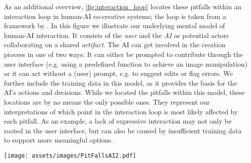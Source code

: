 \documentclass[
twocolumn,
]{ceurart}
\begin{document}
As an additional overview, \cref{fig:interaction_loop} locates these pitfalls within an interaction loop in human-AI co-creative systems; the loop is taken from a framework by \citet{Guzdial2019}. 
In this figure we illustrate our underlying mental model of human-AI interaction. It consists of the \textit{user} and the \textit{AI} as potential actors collaborating on a shared \textit{artifact}. The AI can get involved in the creation process in one of two ways: It can either be prompted to contribute through the user interface (e.g. using a predefined function to achieve an image manipulation) or it can act without a (user) prompt, e.g. to suggest edits or flag errors. We further include the training data in this model, as it provides the basis for the AI's actions and decisions.  
While we located the pitfalls within this model, these locations are by no means the only possible ones. They represent our interpretations of which point in the interaction loop is most likely affected by each pitfall. As an example, a lack of expressive interaction may not only be rooted in the user interface, but can also be caused by insufficient training data to support more meaningful options. 




\begin{figure*}
    \centering
    \texttt{[image: assets/images/PitFallsAI2.pdf]}
    \caption{Visualisation of our underlying mental model of the interaction loop in human-AI co-creative systems. We place our identified pitfalls (see Table \ref{tab:overview}) in this loop based on the position where they most likely occur.}
    \label{fig:interaction_loop}
\end{figure*}
\end{document}
